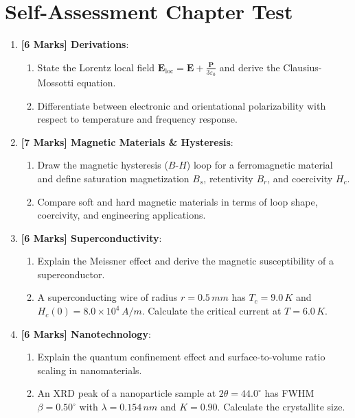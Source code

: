 \section{Self-Assessment Chapter Test}

\begin{chaptertest}
\begin{enumerate}
    \item \textbf{[6 Marks] Derivations}:
    \begin{enumerate}
        \item State the Lorentz local field $\mathbf{E}_{\text{loc}} = \mathbf{E} + \frac{\mathbf{P}}{3\varepsilon_0}$ and derive the Clausius-Mossotti equation.
        \item Differentiate between electronic and orientational polarizability with respect to temperature and frequency response.
    \end{enumerate}
    
    \item \textbf{[7 Marks] Magnetic Materials \& Hysteresis}:
    \begin{enumerate}
        \item Draw the magnetic hysteresis ($B$-$H$) loop for a ferromagnetic material and define saturation magnetization $B_s$, retentivity $B_r$, and coercivity $H_c$.
        \item Compare soft and hard magnetic materials in terms of loop shape, coercivity, and engineering applications.
    \end{enumerate}
    
    \item \textbf{[6 Marks] Superconductivity}:
    \begin{enumerate}
        \item Explain the Meissner effect and derive the magnetic susceptibility of a superconductor.
        \item A superconducting wire of radius $r = 0.5\,\si{mm}$ has $T_c = 9.0\,\si{K}$ and $H_c(0) = 8.0 \times 10^4\,\si{A/m}$. Calculate the critical current at $T = 6.0\,\si{K}$.
    \end{enumerate}
    
    \item \textbf{[6 Marks] Nanotechnology}:
    \begin{enumerate}
        \item Explain the quantum confinement effect and surface-to-volume ratio scaling in nanomaterials.
        \item An XRD peak of a nanoparticle sample at $2\theta = 44.0^\circ$ has FWHM $\beta = 0.50^\circ$ with $\lambda = 0.154\,\si{nm}$ and $K = 0.90$. Calculate the crystallite size.
    \end{enumerate}
\end{enumerate}
\end{chaptertest}


